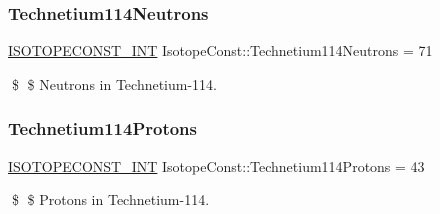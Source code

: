 \subsubsection{\texorpdfstring{Technetium114\+Neutrons}{Technetium114Neutrons}}
{\footnotesize\ttfamily \mbox{\hyperlink{group___isotope_const-_macros_ga5f18360b3e99483a35c32d789e62621c}{I\+S\+O\+T\+O\+P\+E\+C\+O\+N\+S\+T\+\_\+\+I\+NT}} Isotope\+Const\+::\+Technetium114\+Neutrons = 71}

\$ \$ Neutrons in Technetium-\/114. \mbox{\label{group___isotope_const-_technetium-_tc114_ga1465017c2b8ab406df4c04aa27a873f2}} 
\subsubsection{\texorpdfstring{Technetium114\+Protons}{Technetium114Protons}}
{\footnotesize\ttfamily \mbox{\hyperlink{group___isotope_const-_macros_ga5f18360b3e99483a35c32d789e62621c}{I\+S\+O\+T\+O\+P\+E\+C\+O\+N\+S\+T\+\_\+\+I\+NT}} Isotope\+Const\+::\+Technetium114\+Protons = 43}

\$ \$ Protons in Technetium-\/114. 